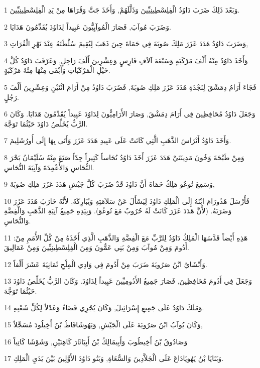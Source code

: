 \par 1 وَبَعْدَ ذَلِكَ ضَرَبَ دَاوُدُ الْفِلِسْطِينِيِّينَ وَذَلَّلَهُمْ, وَأَخَذَ جَتَّ وَقُرَاهَا مِنْ يَدِ الْفِلِسْطِينِيِّينَ.
\par 2 وَضَرَبَ مُوآبَ, فَصَارَ الْمُوآبِيُّونَ عَبِيداً لِدَاوُدَ يُقَدِّمُونَ هَدَايَا.
\par 3 وَضَرَبَ دَاوُدُ هَدَدَ عَزَرَ مَلِكَ صُوبَةَ فِي حَمَاةَ حِينَ ذَهَبَ لِيُقِيمَ سُلْطَتَهُ عِنْدَ نَهْرِ الْفُرَاتِ,
\par 4 وَأَخَذَ دَاوُدُ مِنْهُ أَلْفَ مَرْكَبَةٍ وَسَبْعَةَ آلاَفِ فَارِسٍ وَعِشْرِينَ أَلْفَ رَاجِلٍ, وَعَرْقَبَ دَاوُدُ كُلَّ خَيْلِ الْمَرْكَبَاتِ وَأَبْقَى مِنْهَا مِئَةَ مَرْكَبَةٍ.
\par 5 فَجَاءَ أَرَامُ دِمَشْقَ لِنَجْدَةِ هَدَدَ عَزَرَ مَلِكِ صُوبَةَ, فَضَرَبَ دَاوُدُ مِنْ أَرَامَ اثْنَيْنِ وَعِشْرِينَ أَلْفَ رَجُلٍ.
\par 6 وَجَعَلَ دَاوُدُ مُحَافِظِينَ فِي أَرَامَ دِمَشْقَ, وَصَارَ الأَرَامِيُّونَ لِدَاوُدَ عَبِيداً يُقَدِّمُونَ هَدَايَا. وَكَانَ الرَّبُّ يُخَلِّصُ دَاوُدَ حَيْثُمَا تَوَجَّهَ.
\par 7 وَأَخَذَ دَاوُدُ أَتْرَاسَ الذَّهَبِ الَّتِي كَانَتْ عَلَى عَبِيدِ هَدَدَ عَزَرَ وَأَتَى بِهَا إِلَى أُورُشَلِيمَ.
\par 8 وَمِنْ طَبْحَةَ وَخُونَ مَدِينَتَيْ هَدَدَ عَزَرَ أَخَذَ دَاوُدُ نُحَاساً كَثِيراً جِدّاً صَنَعَ مِنْهُ سُلَيْمَانُ بَحْرَ النُّحَاسِ وَالأَعْمِدَةَ وَآنِيَةَ النُّحَاسِ.
\par 9 وَسَمِعَ تُوعُو مَلِكُ حَمَاةَ أَنَّ دَاوُدَ قَدْ ضَرَبَ كُلَّ جَيْشِ هَدَدَ عَزَرَ مَلِكِ صُوبَةَ,
\par 10 فَأَرْسَلَ هَدُورَامَ ابْنَهُ إِلَى الْمَلِكِ دَاوُدَ لِيَسْأَلَ عَنْ سَلاَمَتِهِ وَيُبَارِكَهُ, لأَنَّهُ حَارَبَ هَدَدَ عَزَرَ وَضَرَبَهُ. (لأَنَّ هَدَدَ عَزَرَ كَانَتْ لَهُ حُرُوبٌ مَعَ تُوعُوَ). وَبِيَدِهِ جَمِيعُ آنِيَةِ الذَّهَبِ وَالْفِضَّةِ وَالنُّحَاسِ.
\par 11 هَذِهِ أَيْضاً قَدَّسَهَا الْمَلِكُ دَاوُدُ لِلرَّبِّ مَعَ الْفِضَّةِ وَالذَّهَبِ الَّذِي أَخَذَهُ مِنْ كُلِّ الأُمَمِ مِنْ: أَدُومَ وَمِنْ مُوآبَ وَمِنْ بَنِي عَمُّونَ وَمِنَ الْفِلِسْطِينِيِّينَ وَمِنْ عَمَالِيقَ.
\par 12 وَأَبْشَايُ ابْنُ صَرُويَةَ ضَرَبَ مِنْ أَدُومَ فِي وَادِي الْمِلْحِ ثَمَانِيَةَ عَشَرَ أَلْفاً.
\par 13 وَجَعَلَ فِي أَدُومَ مُحَافِظِينَ, فَصَارَ جَمِيعُ الأَدُومِيِّينَ عَبِيداً لِدَاوُدَ. وَكَانَ الرَّبُّ يُخَلِّصُ دَاوُدَ حَيْثُمَا تَوَجَّهَ.
\par 14 وَمَلَكَ دَاوُدُ عَلَى جَمِيعِ إِسْرَائِيلَ, وَكَانَ يُجْرِي قَضَاءً وَعَدْلاً لِكُلِّ شَعْبِهِ.
\par 15 وَكَانَ يُوآبُ ابْنُ صَرُويَةَ عَلَى الْجَيْشِ, وَيَهُوشَافَاطُ بْنُ أَخِيلُودَ مُسَجِّلاً,
\par 16 وَصَادُوقُ بْنُ أَخِيطُوبَ وَأَبِيمَالِكُ بْنُ أَبِيَاثَارَ كَاهِنَيْنِ, وَشَوْشَا كَاتِباً
\par 17 وَبَنَايَا بْنُ يَهُويَادَاعَ عَلَى الْجَلاَّدِينَ وَالسُّعَاةِ, وَبَنُو دَاوُدَ الأَوَّلِينَ بَيْنَ يَدَيِ الْمَلِكِ.

